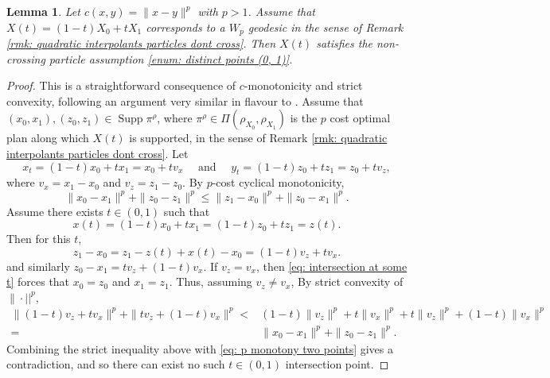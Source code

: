 \documentclass[11pt, oneside, titlepage]{book}
\theoremstyle{plain}
\newtheorem{lemma}[theorem]{Lemma}
\theoremstyle{definition}
\DeclareMathOperator{\supp}{Supp}
\begin{document}
\begin{lemma}
\label{lem: p cost geodesic gives non crossing}
    Let $c(x,y) = \|x-y\|^p$ with $p>1$.
    Assume that $X(t) = (1-t) X_0 + t X_1$ corresponds to a $W_p$ geodesic in the sense of Remark \ref{rmk: quadratic interpolants particles dont cross}. Then $X(t)$ satisfies the non-crossing particle assumption \ref{enum: distinct points (0, 1)}.
\end{lemma}
\begin{proof}
    This is a straightforward consequence of $ c$-monotonicity and strict convexity, following an argument very similar in flavour to \cite[Theorem 2.9]{santambrogio2015optimal}. Assume that $(x_0, x_1), (z_0, z_1) \in \supp \pi^\rho$, where $\pi^\rho \in \Pi(\rho_{X_0}, \rho_{X_1})$ is the $p$ cost optimal plan along which $X(t)$ is supported, in the sense of Remark \ref{rmk: quadratic interpolants particles dont cross}. Let 
    \begin{equation*}
        x_t = (1-t) x_0 + t x_1 = x_0 + t v_x \quad \text{ and } \quad y_t = (1-t) z_0 + t z_1 = z_0 + t v_z,
    \end{equation*}
    where $v_x = x_1 - x_0$ and $v_z = z_1 - z_0$. By $p$-cost cyclical monotonicity,
    \begin{equation}
    \label{eq: p monotony two points}
        \|x_0 - x_1\|^p + \|z_0 - z_1\|^p \leq \|z_1 - x_0\|^p + \|z_0 - x_1\|^p.
    \end{equation}
    Assume there exists $t \in (0, 1)$ such that
    \begin{equation}
    \label{eq: intersection at some t}
        x(t) = (1-t)x_0 + t x_1 = (1-t) z_0 + t z_1 = z(t).
    \end{equation}
    Then for this $t$,
    \begin{equation*}
        z_1 - x_0 = z_1 - z(t) + x(t) - x_0 = (1-t)v_z + t v_x.
    \end{equation*}
    and similarly $z_0 - x_1 = t v_z + (1-t) v_x$. If $v_z = v_x$, then \eqref{eq: intersection at some t} forces that $x_0 = z_0$ and $x_1 = z_1$. Thus, assuming $v_z \neq v_x$, By strict convexity of $\| \cdot ||^p$,
    \begin{align}
        \|(1-t)v_z + t v_x\|^p + \|t v_z + (1-t) v_x\|^p <& (1-t)\|v_z\|^p + t \|v_x\|^p + t\|v_z\|^p + (1-t) \|v_x\|^p\\
        =& \|x_0 - x_1\|^p + \|z_0 - z_1\|^p.
    \end{align}
    Combining the strict inequality above with \eqref{eq: p monotony two points} gives a contradiction, and so there can exist no such $t \in (0, 1)$ intersection point.
\end{proof}
\end{document}
